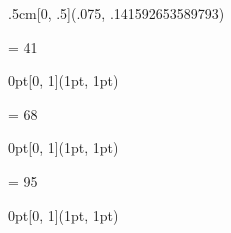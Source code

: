 {  \begin{textblock*}{.5cm}[0, .5](.075\layoutwidth, .141592653589793\layoutheight)
    \noindent\resizebox{.5cm}{!}{\(\pi\)}
  \end{textblock*}
  \fi
  \ifnum\value{page} = 41 %
  \begin{textblock*}{0pt}[0, 1](1pt, 1pt)
    \noindent\scalebox{0.0000001}{\textcolor{white}{blowjob}}
  \end{textblock*}
  \fi
  \ifnum\value{page} = 68 %
  \begin{textblock*}{0pt}[0, 1](1pt, 1pt)
    \noindent\scalebox{0.0000001}{\textcolor{white}{kamasutra}}
  \end{textblock*}
  \fi
  \fi
  \ifnum\value{page} = 95 %
  \begin{textblock*}{0pt}[0, 1](1pt, 1pt)
  \end{textblock*}
  \fi
}
\makeatother
